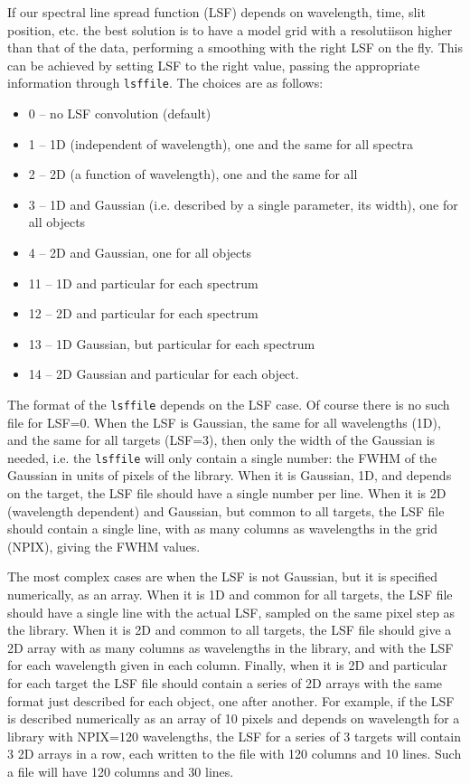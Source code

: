 \documentclass[12pt]{article}
\begin{document}
If our spectral line spread function (LSF) depends on wavelength, time, slit
position, etc. the best solution is to have a model grid with a resolutiison higher
than that of the data, performing a smoothing with the right LSF on the fly.
This can be achieved by setting LSF to the right value, passing the appropriate information
through {\tt lsffile}. The choices are as follows:
\begin{itemize}
\item 0 -- no LSF convolution (default)
\item 1 -- 1D (independent of wavelength), one and the same for all spectra
\item 2 -- 2D (a function of wavelength), one and the same for all
\item 3 -- 1D and Gaussian  (i.e. described by a single parameter, its width), one for all objects
\item 4 -- 2D and Gaussian, one for all objects
\item 11 -- 1D and particular for each spectrum
\item 12 -- 2D and particular for each spectrum
\item 13 -- 1D Gaussian, but particular for each spectrum
\item 14 -- 2D Gaussian and particular for each object.
\end{itemize}

The format of the {\tt lsffile} depends on the LSF case. Of course there is no
such file for LSF=0. When the LSF is Gaussian, the same for all wavelengths (1D), 
and the  same for all targets (LSF=3), then only the width of the Gaussian is needed,
i.e. the {\tt lsffile} will only contain a single number: the FWHM of the Gaussian in
units of pixels of the library. When it is Gaussian, 1D, and
depends on the target, the LSF file should have a single number per line. When it is
2D (wavelength dependent) and Gaussian, but common to all targets, the LSF file should
contain a single line, with as many columns as wavelengths in the grid (NPIX), giving the
FWHM values. 

The most complex cases are when the LSF is not Gaussian, but it is specified numerically,
as an array. When it is 1D and common for all targets, the LSF file should have a single
line with the actual LSF, sampled on the same pixel step as the library. When it is 2D and
common to all targets, the LSF file should give a 2D array with as many columns as wavelengths
in the library, and with the LSF for each wavelength given in each column. Finally, when
it is 2D and particular for each target the LSF file should contain a series of 2D arrays
with the same format just described for each object, one after another. For example, if the
LSF is described numerically as an array of 10 pixels and depends on wavelength for
a library with NPIX=120 wavelengths, the LSF for a series of 3 targets will contain 3
2D arrays in a row, each written to the file with 120 columns and 10 lines. Such a file
will have 120 columns and 30 lines.
\end{document}
